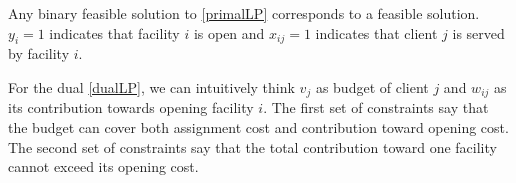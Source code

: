 Any binary feasible solution to \eqref{primalLP} corresponds to a feasible solution. $y_i
= 1$ indicates that facility $i$ is open and $x_{ij} = 1$ indicates that client $j$ is
served by facility $i$. 

%

For the dual \eqref{dualLP}, we can intuitively think $v_j$ as budget of client $j$ and $w_{ij}$ as its contribution towards opening facility $i$. The first set of constraints say that the budget can cover both assignment cost and contribution toward opening cost. The second set of constraints say that the total contribution toward one facility cannot exceed its opening cost.
